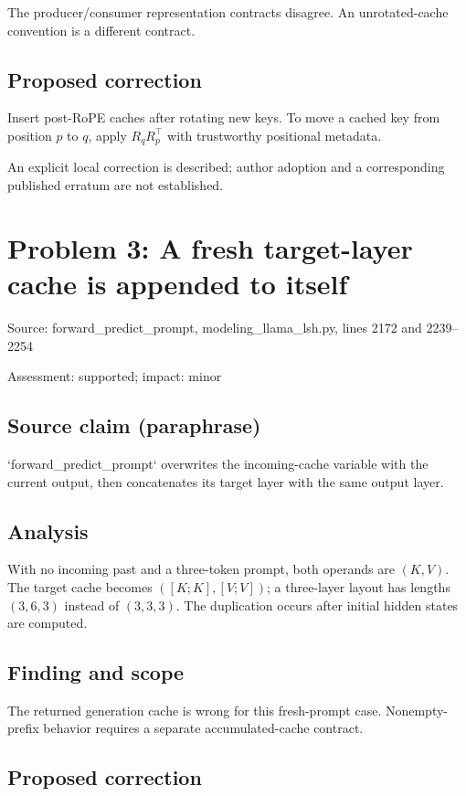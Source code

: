 \documentclass[11pt]{article}
\begin{document}
The producer/consumer representation contracts disagree. An unrotated-cache convention is a different contract.

\subsection*{Proposed correction}

Insert post-RoPE caches after rotating new keys. To move a cached key from position \(p\) to \(q\), apply \(R_qR_p^\top\) with trustworthy positional metadata.

An explicit local correction is described; author adoption and a corresponding published erratum are not established.

\section*{Problem 3: A fresh target-layer cache is appended to itself}

Source: forward\_predict\_prompt, modeling\_llama\_lsh.py, lines 2172 and 2239–2254

Assessment: supported; impact: minor

\subsection*{Source claim (paraphrase)}

`forward\_predict\_prompt` overwrites the incoming-cache variable with the current output, then concatenates its target layer with the same output layer.

\subsection*{Analysis}

With no incoming past and a three-token prompt, both operands are \((K,V)\). The target cache becomes \(([K;K],[V;V])\); a three-layer layout has lengths \((3,6,3)\) instead of \((3,3,3)\). The duplication occurs after initial hidden states are computed.

\subsection*{Finding and scope}

The returned generation cache is wrong for this fresh-prompt case. Nonempty-prefix behavior requires a separate accumulated-cache contract.

\subsection*{Proposed correction}
\end{document}
